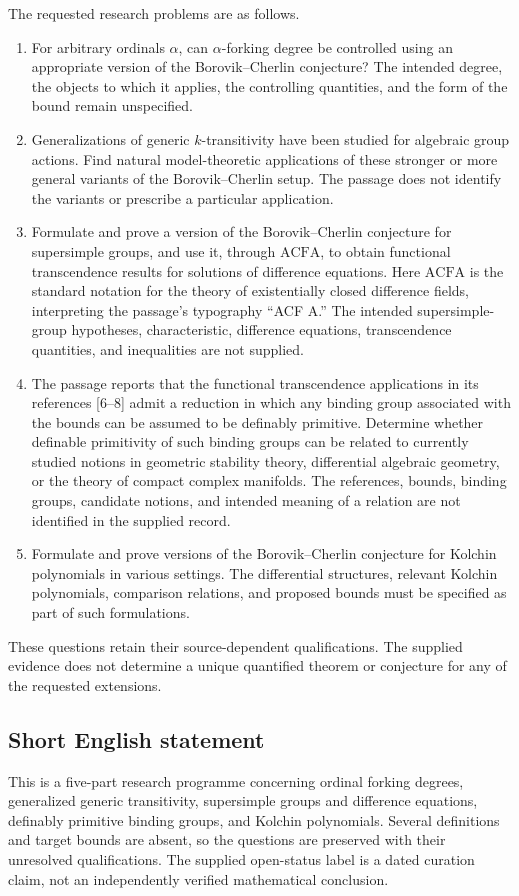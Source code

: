 \documentclass[11pt]{article}
\begin{document}
The requested research problems are as follows.
\begin{enumerate}
\item For arbitrary ordinals \(\alpha\), can \(\alpha\)-forking degree be controlled using an appropriate version of the Borovik--Cherlin conjecture? The intended degree, the objects to which it applies, the controlling quantities, and the form of the bound remain unspecified.
\item Generalizations of generic \(k\)-transitivity have been studied for algebraic group actions. Find natural model-theoretic applications of these stronger or more general variants of the Borovik--Cherlin setup. The passage does not identify the variants or prescribe a particular application.
\item Formulate and prove a version of the Borovik--Cherlin conjecture for supersimple groups, and use it, through \(\mathrm{ACFA}\), to obtain functional transcendence results for solutions of difference equations. Here \(\mathrm{ACFA}\) is the standard notation for the theory of existentially closed difference fields, interpreting the passage's typography ``ACF A.'' The intended supersimple-group hypotheses, characteristic, difference equations, transcendence quantities, and inequalities are not supplied.
\item The passage reports that the functional transcendence applications in its references [6--8] admit a reduction in which any binding group associated with the bounds can be assumed to be definably primitive. Determine whether definable primitivity of such binding groups can be related to currently studied notions in geometric stability theory, differential algebraic geometry, or the theory of compact complex manifolds. The references, bounds, binding groups, candidate notions, and intended meaning of a relation are not identified in the supplied record.
\item Formulate and prove versions of the Borovik--Cherlin conjecture for Kolchin polynomials in various settings. The differential structures, relevant Kolchin polynomials, comparison relations, and proposed bounds must be specified as part of such formulations.
\end{enumerate}
These questions retain their source-dependent qualifications. The supplied evidence does not determine a unique quantified theorem or conjecture for any of the requested extensions.
\subsection{Short English statement}
This is a five-part research programme concerning ordinal forking degrees, generalized generic transitivity, supersimple groups and difference equations, definably primitive binding groups, and Kolchin polynomials. Several definitions and target bounds are absent, so the questions are preserved with their unresolved qualifications. The supplied open-status label is a dated curation claim, not an independently verified mathematical conclusion.
\end{document}
